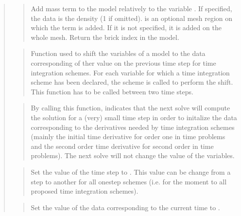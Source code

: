 \documentclass[a4paper,11pt,english]{sphinxmanual}
\begin{document}
\begin{quote}
\begin{quote}
Add mass term to the model relatively to the variable .
If specified, the data  is the
density (1 if omitted).  is an optional mesh region on
which the term is added. If it is not specified, it
is added on the whole mesh. Return the brick index in the model.
\end{quote}

\begin{quote}

Function used to shift the variables of a model to the data
corresponding of ther value on the previous time step for time
integration schemes. For each variable for which a time integration
scheme has been declared, the scheme is called to perform the shift.
This function has to be called between two time steps.
\end{quote}

\begin{quote}

By calling this function, indicates that the next solve will compute
the solution for a (very) small time step  in order to initalize
the data corresponding to the derivatives needed by time integration
schemes (mainly the initial time derivative for order one in time
problems  and the second order time derivative for second order in time
problems). The next solve will not change the value of the variables.
\end{quote}

\begin{quote}

Set the value of the time step to . This value can be change
from a step to another for all one\sphinxhyphen{}step schemes (i.e. for the moment
to all proposed time integration schemes).
\end{quote}

\begin{quote}

Set the value of the data  corresponding to the current time to .
\end{quote}


\end{quote}
\end{document}
